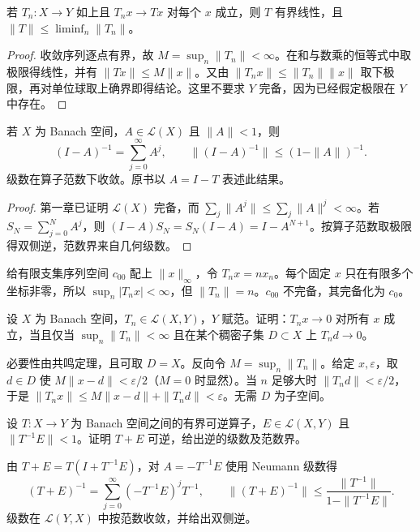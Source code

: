 \begin{corollary}[强极限的连续性]\label{cor:y2-strong-limit}
若 $T_n:X\to Y$ 如上且 $T_nx\to Tx$ 对每个 $x$ 成立，则 $T$ 有界线性，且 $\|T\|\le\liminf_n\|T_n\|$。
\end{corollary}
\begin{proof}
收敛序列逐点有界，故 $M=\sup_n\|T_n\|<\infty$。在和与数乘的恒等式中取极限得线性，并有 $\|Tx\|\le M\|x\|$。又由 $\|T_nx\|\le\|T_n\|\|x\|$ 取下极限，再对单位球取上确界即得结论。这里不要求 $Y$ 完备，因为已经假定极限在 $Y$ 中存在。
\end{proof}

\begin{theorem}[Neumann 级数]\label{thm:y2-neumann}
若 $X$ 为 Banach 空间，$A\in\mathcal L(X)$ 且 $\|A\|<1$，则
\[
 (I-A)^{-1}=\sum_{j=0}^\infty A^j,\qquad
 \|(I-A)^{-1}\|\le(1-\|A\|)^{-1}.
\]
级数在算子范数下收敛。原书以 $A=I-T$ 表述此结果。
\end{theorem}
\begin{proof}
第一章已证明 $\mathcal L(X)$ 完备，而 $\sum_j\|A^j\|\le\sum_j\|A\|^j<\infty$。若 $S_N=\sum_{j=0}^NA^j$，则 $(I-A)S_N=S_N(I-A)=I-A^{N+1}$。按算子范数取极限得双侧逆，范数界来自几何级数。
\end{proof}

\begin{example}[源空间完备性的作用]
给有限支集序列空间 $c_{00}$ 配上 $\|x\|_\infty$，令 $T_nx=nx_n$。每个固定 $x$ 只在有限多个坐标非零，所以 $\sup_n|T_nx|<\infty$，但 $\|T_n\|=n$。$c_{00}$ 不完备，其完备化为 $c_0$。
\end{example}

\begin{exercise}
设 $X$ 为 Banach 空间，$T_n\in\mathcal L(X,Y)$，$Y$ 赋范。证明：$T_nx\to0$ 对所有 $x$ 成立，当且仅当 $\sup_n\|T_n\|<\infty$ 且在某个稠密子集 $D\subset X$ 上 $T_nd\to0$。
\end{exercise}
\begin{solution}
必要性由共鸣定理，且可取 $D=X$。反向令 $M=\sup_n\|T_n\|$。给定 $x,\varepsilon$，取 $d\in D$ 使 $M\|x-d\|<\varepsilon/2$（$M=0$ 时显然）。当 $n$ 足够大时 $\|T_nd\|<\varepsilon/2$，于是 $\|T_nx\|\le M\|x-d\|+\|T_nd\|<\varepsilon$。无需 $D$ 为子空间。
\end{solution}

\begin{exercise}
设 $T:X\to Y$ 为 Banach 空间之间的有界可逆算子，$E\in\mathcal L(X,Y)$ 且 $\|T^{-1}E\|<1$。证明 $T+E$ 可逆，给出逆的级数及范数界。
\end{exercise}
\begin{solution}
由 $T+E=T(I+T^{-1}E)$，对 $A=-T^{-1}E$ 使用 Neumann 级数得
\[
 (T+E)^{-1}=\sum_{j=0}^\infty(-T^{-1}E)^jT^{-1},\qquad
 \|(T+E)^{-1}\|\le\frac{\|T^{-1}\|}{1-\|T^{-1}E\|}.
\]
级数在 $\mathcal L(Y,X)$ 中按范数收敛，并给出双侧逆。
\end{solution}
